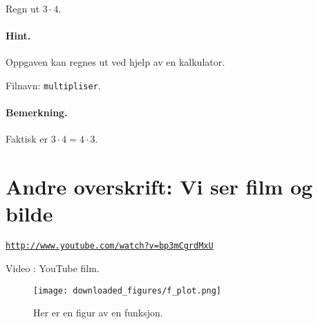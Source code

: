 \documentclass[%
norsk,oneside,                 %
final,                   %
10pt]{article}
\newenvironment{doconce:movie}{}{}
\newcounter{doconce:movie:counter}
\newenvironment{doconceexercise}{}{}
\newcounter{doconceexercisecounter}
\begin{document}
\begin{doconceexercise}

                             

Regn ut $3\cdot 4$.


\paragraph{Hint.}
Oppgaven kan regnes ut ved hjelp av en kalkulator.

\noindent Filnavn: \texttt{multipliser}.


\paragraph{Bemerkning.}
Faktisk er $3\cdot 4 = 4\cdot 3$.

\end{doconceexercise}

\section{Andre overskrift: Vi ser film og bilde}


\begin{doconce:movie}
\begin{center}
\href{{http://www.youtube.com/watch?v=bp3mCgrdMxU}}{\nolinkurl{http://www.youtube.com/watch?v=bp3mCgrdMxU}}
\end{center}

\begin{center}  %
Video : YouTube film.
\end{center}
\end{doconce:movie}


\begin{figure}[!ht]  %
  \centerline{\texttt{[image: downloaded\_figures/f\_plot.png]}}
  \caption{
  Her er en figur av en funksjon.
  }
\end{figure}



\cleardoublepage{}  %
\printindex
\end{document}
